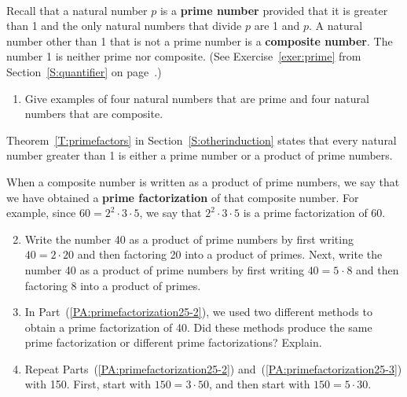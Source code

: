\begin{previewactivity}\label{PA:primefactorization25} \hfill \\
Recall that a natural number  $p$  is  a \textbf{prime number}
%
\label{def:prime}%
 provided that it is greater than 1 and the only natural numbers that divide  $p$  are  1  and  $p$.  A natural number other than 1 that is not a prime number is a \textbf{composite number}.
%
  The number 1 is neither prime nor composite.  (See Exercise~\ref{exer:prime} from Section~\ref{S:quantifier} on page~\pageref{exer:prime}.)

\begin{enumerate}
\item Give examples of four natural numbers that are prime and four natural numbers that are composite.
\end{enumerate}

Theorem~\ref{T:primefactors} in Section~\ref{S:otherinduction} states that every natural number greater than  1  is either a prime number or a product of prime numbers.

When a composite number is written as a product of prime numbers, we say that we have obtained a \textbf{prime factorization}
%
\label{def:primefactorization}%
 of that composite number.  For example, since $60 = 2^2 \cdot 3 \cdot 5$, we say that $2^2 \cdot 3 \cdot 5$ is a prime factorization of 60.

\begin{enumerate}
\setcounter{enumi}{1}
\item Write the number  40  as a product of prime numbers by first writing  $40 = 2 \cdot 20$
 and then factoring  20  into a product of primes.  Next, write the number  40  as a product of prime numbers by first writing  $40 = 5 \mspace{1mu}\cdot\mspace{1mu} 8$  and then factoring  8  into a product of primes.  
\label{PA:primefactorization25-2}%

\item In Part~(\ref{PA:primefactorization25-2}), we used two different methods to obtain a prime factorization of  40.  Did these methods produce the same prime factorization or different prime factorizations?  Explain.  
\label{PA:primefactorization25-3}%

\item Repeat Parts~(\ref{PA:primefactorization25-2}) and~(\ref{PA:primefactorization25-3}) with 150.  First, start with  
$150 = 3 \cdot 50$, and then start with  
$150 = 5 \cdot 30$.
\end{enumerate}
\end{previewactivity}

\hbreak
%


\endinput
